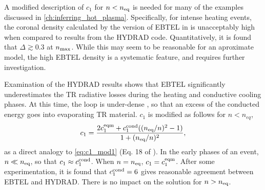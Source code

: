 A modified description of $c_1$ for $n < n_\textup{eq}$ is needed for many of the examples discussed in \autoref{ch:inferring_hot_plasma}. Specifically, for intense heating events, the coronal density calculated by the version of EBTEL in \citet{cargill_enthalpy-based_2012} is unacceptably high when compared to results from the HYDRAD code. Quantitatively, it is found that $\Delta\gtrsim0.3$ at $n_\textup{max}$. While this may seem to be reasonable for an aproximate model, the high EBTEL density is a systematic feature, and requires further investigation.

Examination of the HYDRAD results shows that EBTEL significantly underestimates the TR radiative losses during the heating and conductive cooling phases. At this time, the loop is under-dense \citep[e.g.][]{cargill_nanoflare_2004}, so that an excess of the conducted energy goes into evaporating TR material. $c_1$ is modified as follows for $n < n_{eq}$,
\begin{equation}\label{eq:c1_mod}
    c_1 = \frac{2c_1^\textup{eqm} + c_1^\textup{cond}((n_\textup{eq}/n)^2-1)}{1+(n_\textup{eq}/n)^2},
\end{equation}
as a direct analogy to \autoref{eq:c1_mod1} (Eq. 18 of \citet{cargill_enthalpy-based_2012}). In the early phases of an event, $n \ll n_\textup{eq}$, so that $c_1 \approx c_1^\textup{cond}$. When $n = n_\textup{eq}$, $c_1 = c_1^\textup{eqm}$. After some experimentation, it is found that $c_1^\textup{cond} = 6$  gives reasonable agreement between EBTEL and HYDRAD. There is no impact on the solution for $n > n_\textup{eq}$.

